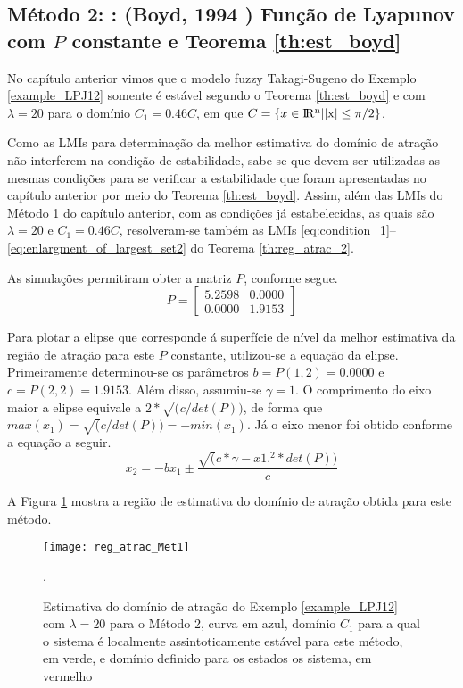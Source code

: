 \subsection{Método 2: : (Boyd, 1994 \cite{bookboydl:1994}) Função de Lyapunov com $P$ constante e Teorema \ref{th:est_boyd}}

No capítulo anterior vimos que o modelo fuzzy Takagi-Sugeno do Exemplo \ref{example_LPJ12} somente é estável segundo o Teorema \ref{th:est_boyd} e com $\lambda = 20$ para o domínio $C_1 = 0.46C$, em que $C = \{x \in \rm I\!R^n | |x| \leq \pi/2\}$.

Como as LMIs para determinação da melhor estimativa do domínio de atração não interferem na condição de estabilidade, sabe-se que devem ser utilizadas as mesmas condições para se verificar a estabilidade que foram apresentadas no capítulo anterior por meio do Teorema \ref{th:est_boyd}. Assim, além das LMIs do Método 1 do capítulo anterior, com as condições já estabelecidas, as quais são $\lambda = 20$ e $C_1 = 0.46C$, resolveram-se também as LMIs \ref{eq:condition_1}--\ref{eq:enlargment_of_largest_set2} do Teorema \ref{th:reg_atrac_2}.

As simulações permitiram obter a matriz $P$, conforme segue.
\begin{equation*}
P = \begin{bmatrix}5.2598&0.0000\\0.0000&1.9153\end{bmatrix}
\end{equation*}

Para plotar a elipse que corresponde á superfície de nível da melhor estimativa da região de atração para este $P$ constante, utilizou-se a equação da elipse. Primeiramente determinou-se os parâmetros $b = P(1,2) = 0.0000$ e $c = P(2, 2) = 1.9153$. Além disso, assumiu-se $\gamma = 1$.
O comprimento do eixo maior a elipse equivale a $2*\sqrt(c/det(P))$, de forma que $max(x_1) = \sqrt(c/det(P)) = -min(x_1)$. Já o eixo menor foi obtido conforme a equação a seguir.
\begin{equation*}
x_2=-bx_1\pm \dfrac{\sqrt(c*\gamma-x1.^2*det(P))}{c}
\end{equation*}

A Figura \ref{fig:reg_atrac_Met1} mostra a região de estimativa do domínio de atração obtida para este método.

\begin{figure}[htbp]
	\centering
	\texttt{[image: reg\_atrac\_Met1]}
	\caption{Estimativa do domínio de atração do Exemplo \ref{example_LPJ12} com $\lambda = 20$ para o Método 2, curva em azul, domínio $C_1$ para a qual o sistema é localmente assintoticamente estável para este método, em verde, e domínio definido para os estados os sistema, em vermelho}.
	\label{fig:reg_atrac_Met1}
\end{figure}

